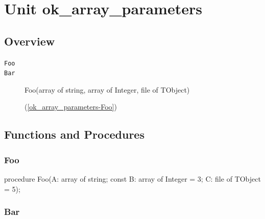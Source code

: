 \documentclass{report}
\newif\ifpdf
\begin{document}
\label{toc}\tableofcontents
\newpage
\newlength{\tmplength}
\chapter{Unit ok{\_}array{\_}parameters}
\label{ok_array_parameters}
\section{Overview}
\begin{description}
\item[\texttt{Foo}]
\item[\texttt{Bar}]\begin{ttfamily}Foo(array of string, array of Integer, file of TObject)\end{ttfamily}(\ref{ok_array_parameters-Foo})
\end{description}
\section{Functions and Procedures}
\ifpdf
\subsection*{\large{\textbf{Foo}}\normalsize\hspace{1ex}\hrulefill}
\else
\subsection*{Foo}
\fi
\label{ok_array_parameters-Foo}
\begin{list}{}{
\setlength{\itemindent}{0cm}
\setlength{\listparindent}{0cm}
\setlength{\leftmargin}{\evensidemargin}
\addtolength{\leftmargin}{\tmplength}
\settowidth{\labelsep}{X}
\addtolength{\leftmargin}{\labelsep}
\setlength{\labelwidth}{\tmplength}
}
\item[\textbf{Declaration}\hfill]
\ifpdf
\begin{flushleft}
\fi
\begin{ttfamily}
procedure Foo(A: array of string; const B: array of Integer = 3; C: file of TObject = 5);\end{ttfamily}

\ifpdf
\end{flushleft}
\fi

\end{list}
\ifpdf
\subsection*{\large{\textbf{Bar}}\normalsize\hspace{1ex}\hrulefill}
\else
\end{document}
